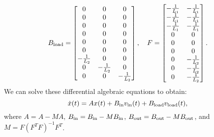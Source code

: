 \documentclass[12pt]{article}
\begin{document}
\[
B_{\rm load} = 
\begin{bmatrix} 
0 & 0 & 0 \\
0 & 0 & 0 \\
0 & 0 & 0 \\
0 & 0 & 0 \\
0 & 0 & 0 \\
0 & 0 & 0 \\
-\frac1{L_2} & 0 & 0 \\
0 & -\frac1{L_2} & 0 \\
0 & 0 & -\frac1{L_2} \\
\end{bmatrix},
\quad
F =
\begin{bmatrix} 
-\frac1{L_1} & -\frac1{L_1} \\
-\frac1{L_1} & -\frac1{L_1} \\
-\frac1{L_1} & -\frac1{L_1} \\
0 & 0 \\
0 & 0 \\
0 & 0 \\
0 & -\frac1{L_2} \\
0 & -\frac1{L_2} \\
0 & -\frac1{L_2} \\
\end{bmatrix}.
\]
We can solve these differential algebraic equations to obtain:
\[
\dot x(t) = A x(t) + B_{\rm in} v_{\rm in}(t) + B_{\rm load} v_{\rm load}(t),
\]
where 
$A = A - M A$, 
$B_{\rm in} = B_{\rm in} -  M  B_{\rm in}$,
$B_{\rm out} = B_{\rm out} - M   B_{\rm out}$,
and $M = F(F^T F)^{-1} F^T$.
\end{document}

